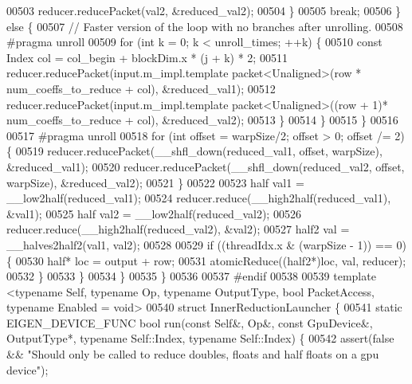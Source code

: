\begin{DoxyCode}
00503             reducer.reducePacket(val2, &reduced\_val2);
00504           \}
00505           \textcolor{keywordflow}{break};
00506         \} \textcolor{keywordflow}{else} \{
00507           \textcolor{comment}{// Faster version of the loop with no branches after unrolling.}
00508 \textcolor{preprocessor}{#pragma unroll}
00509           \textcolor{keywordflow}{for} (\textcolor{keywordtype}{int} k = 0; k < unroll\_times; ++k) \{
00510             \textcolor{keyword}{const} Index col = col\_begin + blockDim.x * (j + k) * 2;
00511             reducer.reducePacket(input.m\_impl.template packet<Unaligned>(row * num\_coeffs\_to\_reduce + col),
       &reduced\_val1);
00512             reducer.reducePacket(input.m\_impl.template packet<Unaligned>((row + 1)* num\_coeffs\_to\_reduce + 
      col), &reduced\_val2);
00513           \}
00514         \}
00515       \}
00516 
00517 \textcolor{preprocessor}{#pragma unroll}
00518       \textcolor{keywordflow}{for} (\textcolor{keywordtype}{int} offset = warpSize/2; offset > 0; offset /= 2) \{
00519         reducer.reducePacket(\_\_shfl\_down(reduced\_val1, offset, warpSize), &reduced\_val1);
00520         reducer.reducePacket(\_\_shfl\_down(reduced\_val2, offset, warpSize), &reduced\_val2);
00521       \}
00522 
00523       half val1 =  \_\_low2half(reduced\_val1);
00524       reducer.reduce(\_\_high2half(reduced\_val1), &val1);
00525       half val2 =  \_\_low2half(reduced\_val2);
00526       reducer.reduce(\_\_high2half(reduced\_val2), &val2);
00527       half2 val = \_\_halves2half2(val1, val2);
00528 
00529       \textcolor{keywordflow}{if} ((threadIdx.x & (warpSize - 1)) == 0) \{
00530         half* loc = output + row;
00531         atomicReduce((half2*)loc, val, reducer);
00532       \}
00533     \}
00534   \}
00535 \}
00536 
00537 \textcolor{preprocessor}{#endif}
00538 
00539 \textcolor{keyword}{template} <\textcolor{keyword}{typename} Self, \textcolor{keyword}{typename} Op, \textcolor{keyword}{typename} OutputType, \textcolor{keywordtype}{bool} PacketAccess, \textcolor{keyword}{typename} Enabled = \textcolor{keywordtype}{void}>
00540 \textcolor{keyword}{struct }InnerReductionLauncher \{
00541   \textcolor{keyword}{static} EIGEN\_DEVICE\_FUNC \textcolor{keywordtype}{bool} run(\textcolor{keyword}{const} Self&, Op&, \textcolor{keyword}{const} GpuDevice&, OutputType*, \textcolor{keyword}{typename} Self::Index, \textcolor{keyword}{
      typename} Self::Index) \{
00542     assert(\textcolor{keyword}{false} && \textcolor{stringliteral}{"Should only be called to reduce doubles, floats and half floats on a gpu device"});

\end{DoxyCode}
